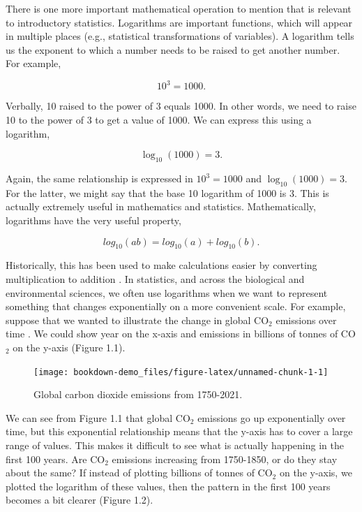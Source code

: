 \documentclass[
  openany]{scrbook}
\begin{document}
There is one more important mathematical operation to mention that is relevant to introductory statistics.
Logarithms are important functions, which will appear in multiple places (e.g., statistical transformations of variables).
A logarithm tells us the exponent to which a number needs to be raised to get another number.
For example,

\[10^{3} = 1000.\]

Verbally, 10 raised to the power of 3 equals 1000.
In other words, we need to raise 10 to the power of 3 to get a value of 1000.
We can express this using a logarithm,

\[\log_{10}\left(1000\right) = 3.\]

Again, the same relationship is expressed in \(10^{3} = 1000\) and \(\log_{10}(1000) = 3\).
For the latter, we might say that the base 10 logarithm of 1000 is 3.
This is actually extremely useful in mathematics and statistics.
Mathematically, logarithms have the very useful property,

\[log_{10}(ab) = log_{10}(a) + log_{10}(b).\]

Historically, this has been used to make calculations easier by converting multiplication to addition \citep{Stewart2008}.
In statistics, and across the biological and environmental sciences, we often use logarithms when we want to represent something that changes exponentially on a more convenient scale.
For example, suppose that we wanted to illustrate the change in global CO\(_{2}\) emissions over time \citep{Friedlingstein2022}.
We could show year on the x-axis and emissions in billions of tonnes of CO\(_{2}\) on the y-axis (Figure 1.1).

\begin{figure}
\texttt{[image: bookdown-demo\_files/figure-latex/unnamed-chunk-1-1]} \caption{Global carbon dioxide emissions from 1750-2021.}\label{fig:unnamed-chunk-1}
\end{figure}

We can see from Figure 1.1 that global CO\(_{2}\) emissions go up exponentially over time, but this exponential relationship means that the y-axis has to cover a large range of values.
This makes it difficult to see what is actually happening in the first 100 years.
Are CO\(_{2}\) emissions increasing from 1750-1850, or do they stay about the same?
If instead of plotting billions of tonnes of CO\(_{2}\) on the y-axis, we plotted the logarithm of these values, then the pattern in the first 100 years becomes a bit clearer (Figure 1.2).
\end{document}
